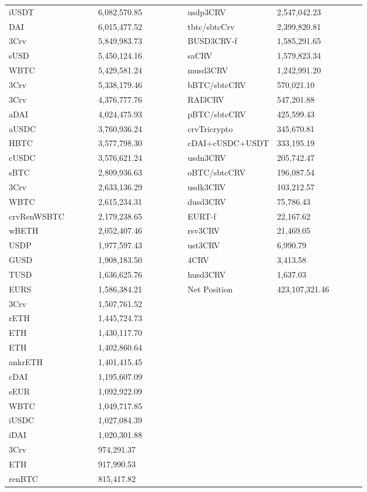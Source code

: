 \begin{longtable}{@{}p{0.25\linewidth}p{0.25\linewidth}p{0.25\linewidth}p{0.25\linewidth}@{}}
iUSDT & 6,082,570.85 & usdp3CRV &2,547,042.23 \\
DAI & 6,015,477.52 & tbtc/sbtcCrv &2,399,820.81 \\
3Crv & 5,849,983.73 & BUSD3CRV-f &1,585,291.65 \\
sUSD & 5,450,124.16 & saCRV &1,579,823.34 \\
WBTC & 5,429,581.24 & musd3CRV &1,242,991.20 \\
3Crv & 5,338,179.46 & bBTC/sbtcCRV &570,021.10 \\
3Crv & 4,376,777.76 & RAI3CRV &547,201.88 \\
aDAI & 4,024,475.93 & pBTC/sbtcCRV &425,599.43 \\
aUSDC & 3,760,936.24 & crvTricrypto &345,670.81 \\
HBTC & 3,577,798.30 & cDAI+cUSDC+USDT &333,195.19 \\
cUSDC & 3,576,621.24 & usdn3CRV &205,742.47 \\
sBTC & 2,809,936.63 & oBTC/sbtcCRV &196,087.54 \\
3Crv & 2,633,136.29 & usdk3CRV &103,212.57 \\
WBTC & 2,615,234.31 & dusd3CRV &75,786.43 \\
crvRenWSBTC & 2,179,238.65 & EURT-f &22,167.62 \\
wBETH & 2,052,407.46 & rsv3CRV &21,469.05 \\
USDP & 1,977,597.43 & ust3CRV &6,990.79 \\
GUSD & 1,908,183.50 & 4CRV &3,413.58 \\
TUSD & 1,636,625.76 & husd3CRV &1,637.03 \\
EURS & 1,586,384.21 & Net Position &423,107,321.46 \\
3Crv & 1,507,761.52 & & \\
rETH & 1,445,724.73 & & \\
ETH & 1,430,117.70 & & \\
ETH & 1,402,860.64 & & \\
ankrETH & 1,401,415.45 & & \\
cDAI & 1,195,607.09 & & \\
sEUR & 1,092,922.09 & & \\
WBTC & 1,049,717.85 & & \\
iUSDC & 1,027,084.39 & & \\
iDAI & 1,020,301.88 & & \\
3Crv & 974,291.37 & & \\
ETH & 917,990.53 & & \\
renBTC & 815,417.82 & & \\

\end{longtable}
